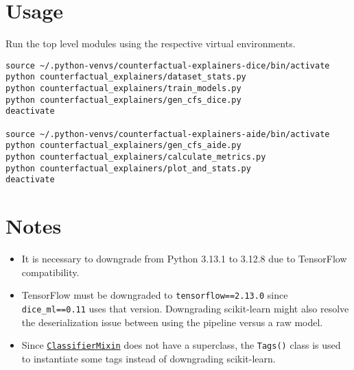 \section{Usage}
Run the top level modules using the respective virtual environments.
\begin{lstlisting}[style=shell]
source ~/.python-venvs/counterfactual-explainers-dice/bin/activate
python counterfactual_explainers/dataset_stats.py
python counterfactual_explainers/train_models.py
python counterfactual_explainers/gen_cfs_dice.py
deactivate

source ~/.python-venvs/counterfactual-explainers-aide/bin/activate
python counterfactual_explainers/gen_cfs_aide.py
python counterfactual_explainers/calculate_metrics.py
python counterfactual_explainers/plot_and_stats.py
deactivate
\end{lstlisting}

\section{Notes}
\begin{itemize}
    \item It is necessary to downgrade from Python 3.13.1 to 3.12.8 due to TensorFlow compatibility.
    \item TensorFlow must be downgraded to \texttt{tensorflow==2.13.0} since \texttt{dice\_ml==0.11} uses that version. Downgrading scikit-learn might also resolve the deserialization issue between using the pipeline versus a raw model.
    \item Since \href{https://github.com/scikit-learn/scikit-learn/blob/d666202a9349893c1bd106cc9ee0ff0a807c7cf3/sklearn/base.py#L540}{\texttt{ClassifierMixin}} does not have a superclass, the \texttt{Tags()} class is used to instantiate some tags instead of downgrading scikit-learn.
\end{itemize}
